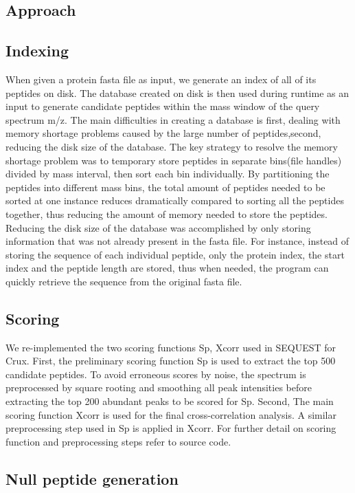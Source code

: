 \documentclass{bioinfo}
\begin{document}
\begin{itemize}
\section{Approach}

\subsection{Indexing}
When given a protein fasta file as input, we generate an index of all
of its peptides on disk. The database created on disk is then used
during runtime as an input to generate candidate peptides within the
mass window of the query spectrum m/z. The main difficulties in
creating a database is first, dealing with memory shortage problems
caused by the large number of peptides,second, reducing the disk size
of the database. The key strategy to resolve the memory shortage
problem was to temporary store peptides in separate bins(file handles)
divided by mass interval, then sort each bin individually. By
partitioning the peptides into different mass bins, the total amount
of peptides needed to be sorted at one instance reduces dramatically
compared to sorting all the peptides together, thus reducing the
amount of memory needed to store the peptides. Reducing the disk size
of the database was accomplished by only storing information that was
not already present in the fasta file. For instance, instead of
storing the sequence of each individual peptide, only the protein
index, the start index and the peptide length are stored, thus when
needed, the program can quickly retrieve the sequence from the
original fasta file.

\subsection{Scoring}
We re-implemented the two scoring functions Sp, Xcorr used in SEQUEST
for Crux.  First, the preliminary scoring function Sp is used to
extract the top 500 candidate peptides. To avoid erroneous scores by
noise, the spectrum is preprocessed by square rooting and smoothing
all peak intensities before extracting the top 200 abundant peaks to
be scored for Sp.  Second, The main scoring function Xcorr is used for
the final cross-correlation analysis. A similar preprocessing step
used in Sp is applied in Xcorr. For further detail on scoring function
and preprocessing steps refer to source code.

\subsection{Null peptide generation}

\end{itemize}
\end{document}
